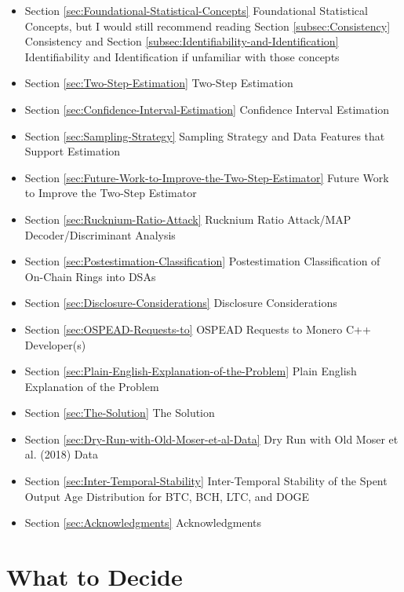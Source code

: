 \documentclass[english]{article}
\begin{document}
\begin{itemize}
\item Section \ref{sec:Foundational-Statistical-Concepts} Foundational
Statistical Concepts, but I would still recommend reading Section
\ref{subsec:Consistency} Consistency and Section \ref{subsec:Identifiability-and-Identification}
Identifiability and Identification if unfamiliar with those concepts
\item Section \ref{sec:Two-Step-Estimation} Two-Step Estimation
\item Section \ref{sec:Confidence-Interval-Estimation} Confidence Interval
Estimation
\item Section \ref{sec:Sampling-Strategy} Sampling Strategy and Data Features
that Support Estimation
\item Section \ref{sec:Future-Work-to-Improve-the-Two-Step-Estimator} Future
Work to Improve the Two-Step Estimator
\item Section \ref{sec:Rucknium-Ratio-Attack} Rucknium Ratio Attack/MAP
Decoder/Discriminant Analysis
\item Section \ref{sec:Postestimation-Classification} Postestimation Classification
of On-Chain Rings into DSAs
\item Section \ref{sec:Disclosure-Considerations} Disclosure Considerations
\item Section \ref{sec:OSPEAD-Requests-to} OSPEAD Requests to Monero C++
Developer(s) 
\item Section \ref{sec:Plain-English-Explanation-of-the-Problem} Plain
English Explanation of the Problem
\item Section \ref{sec:The-Solution} The Solution
\item Section \ref{sec:Dry-Run-with-Old-Moser-et-al-Data} Dry Run with
Old M{\:o}ser et al. (2018) Data
\item Section \ref{sec:Inter-Temporal-Stability} Inter-Temporal Stability
of the Spent Output Age Distribution for BTC, BCH, LTC, and DOGE
\item Section \ref{sec:Acknowledgments} Acknowledgments
\end{itemize}

\section{What to Decide\label{sec:What-to-Decide}}
\end{document}
